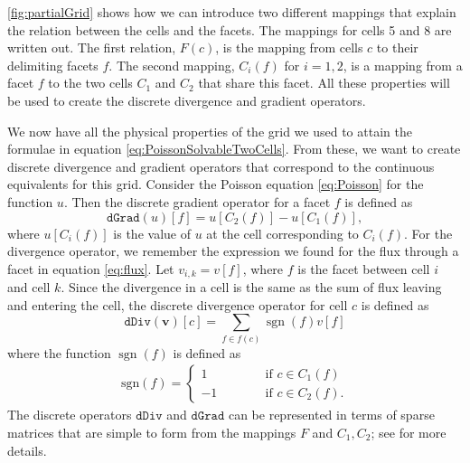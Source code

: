 \autoref{fig:partialGrid} shows how we can introduce two different mappings that explain the relation between the cells and the facets. The mappings for cells 5 and 8 are written out. The first relation, $F(c)$, is the mapping from cells $c$ to their delimiting facets $f$. The second mapping, $C_i(f)$ for $i = 1,2$, is a mapping from a facet $f$ to the two cells $C_1$ and $C_2$ that share this facet. All these properties will be used to create the discrete divergence and gradient operators.

We now have all the physical properties of the grid we used to attain the formulae in equation \eqref{eq:PoissonSolvableTwoCells}. From these, we want to create discrete divergence and gradient operators that correspond to the continuous equivalents for this grid. Consider the Poisson equation \eqref{eq:Poisson} for the function $u$. Then the discrete gradient operator for a facet $f$ is defined as 
\begin{equation}
    \texttt{dGrad}(u)[f] = u[C_2(f)] - u[C_1(f)], 
    \label{eq:discreteGradient}
\end{equation}
where $u[C_i(f)]$ is the value of $u$ at the cell corresponding to $C_i(f)$. For the divergence operator, we remember the expression we found for the flux through a facet in equation \eqref{eq:flux}. Let $v_{i,k} = v[f]$, where $f$ is the facet between cell $i$ and cell $k$. Since the divergence in a cell is the same as the sum of flux leaving and entering the cell, the discrete divergence operator for cell $c$ is defined as 
\begin{equation*}
    \texttt{dDiv}(\textbf{v})[c] = \sum_{f\in f(c)} \operatorname{sgn}(f)v[f]
\end{equation*}
where the function $\operatorname{sgn}(f)$ is defined as 
\begin{align*}
    \text{sgn}(f) = \left\lbrace
    \begin{array}{rl}
        1 \hspace{3em}&\text{if } c \in C_1(f)\\
        -1 \hspace{3em}&\text{if } c \in C_2(f).
    \end{array}
    \right.
\end{align*}
The discrete operators $\texttt{dDiv}$ and $\texttt{dGrad}$ can be represented in terms of sparse matrices that are simple to form from the mappings $F$ and $C_1,C_2$; see \cite{lieMrstUrl} for more details.

